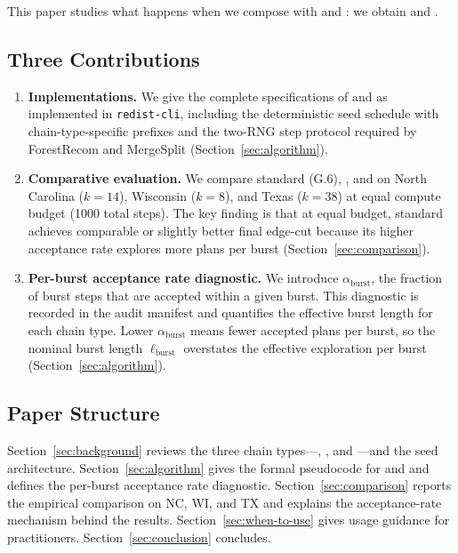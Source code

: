 This paper studies what happens when we compose \sburst{} with \frecom{}
and \ms{}: we obtain \sbf{} and \sbms{}.

\subsection{Three Contributions}

\begin{enumerate}
  \item \textbf{Implementations.}
        We give the complete specifications of \sbf{} and \sbms{} as
        implemented in \texttt{redist-cli}, including the deterministic
        seed schedule with chain-type-specific prefixes and the two-RNG
        step protocol required by ForestRecom and MergeSplit
        (Section~\ref{sec:algorithm}).

  \item \textbf{Comparative evaluation.}
        We compare standard \sburst{} (G.6), \sbf{}, and \sbms{} on
        North Carolina ($k=14$), Wisconsin ($k=8$), and Texas ($k=38$)
        at equal compute budget (1000 total steps).
        The key finding is that at equal budget, standard \sburst{}
        achieves comparable or slightly better final edge-cut because its
        higher acceptance rate explores more plans per burst
        (Section~\ref{sec:comparison}).

  \item \textbf{Per-burst acceptance rate diagnostic.}
        We introduce $\alpha_{\mathrm{burst}}$, the fraction of burst
        steps that are accepted within a given burst.
        This diagnostic is recorded in the audit manifest and quantifies
        the effective burst length for each chain type.
        Lower $\alpha_{\mathrm{burst}}$ means fewer accepted plans per
        burst, so the nominal burst length $\ell_{\mathrm{burst}}$
        overstates the effective exploration per burst
        (Section~\ref{sec:algorithm}).
\end{enumerate}

\subsection{Paper Structure}

Section~\ref{sec:background} reviews the three chain types---\sburst{},
\frecom{}, and \ms{}---and the seed architecture.
Section~\ref{sec:algorithm} gives the formal pseudocode for \sbf{} and
\sbms{} and defines the per-burst acceptance rate diagnostic.
Section~\ref{sec:comparison} reports the empirical comparison on NC, WI,
and TX and explains the acceptance-rate mechanism behind the results.
Section~\ref{sec:when-to-use} gives usage guidance for practitioners.
Section~\ref{sec:conclusion} concludes.
